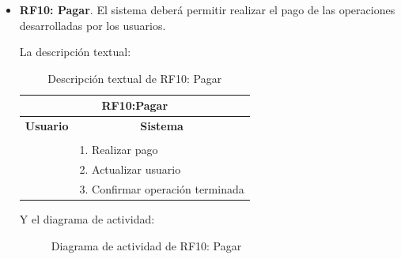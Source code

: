 \begin{itemize}
	\FloatBarrier
	\item \textbf{RF10: Pagar}. El sistema deberá permitir realizar el pago de las operaciones desarrolladas por los usuarios.
	
	La descripción textual:
	\begin{table}[h]
		\centering	
		\begin{tabular}{|l|l|}
			\hline
			\multicolumn{2}{|c|}{\textbf{RF10:Pagar}} \\ \hline
			\multicolumn{1}{|c|}{\textbf{Usuario}} & \multicolumn{1}{c|}{\textbf{Sistema}} \\ \hline
			[Pto. inclusión: RF06: Coger bicicleta] &\\ \hline
			& 1. Realizar pago \\ \hline
			& 2. Actualizar usuario \\ \hline 
			& 3. Confirmar operación terminada \\ \hline 	
		\end{tabular}
		\caption{Descripción textual de RF10: Pagar}
		\label{tab:tablaDescTextualRF10}
	\end{table}
	
	Y el diagrama de actividad:
	\begin{figure}[!htb]
		\centering
		\caption{Diagrama de actividad de RF10: Pagar}
		\label{fig:diagramaActividad_RF10}
	\end{figure}
	

\end{itemize}
